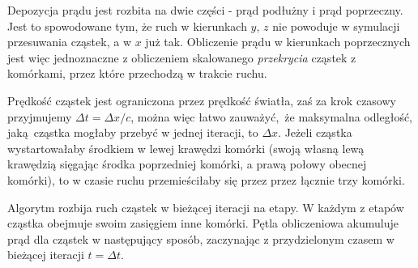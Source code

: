Depozycja prądu jest rozbita na dwie części - prąd podłużny i prąd
poprzeczny. Jest to spowodowane tym, że ruch w kierunkach $y$, $z$ nie
powoduje w symulacji przesuwania cząstek, a w $x$ już tak. Obliczenie prądu
w kierunkach poprzecznych jest więc jednoznaczne z obliczeniem skalowanego
\emph{przekrycia} cząstek z komórkami, przez które przechodzą w trakcie
ruchu.

Prędkość cząstek jest ograniczona przez prędkość światła, zaś za krok czasowy
przyjmujemy $\Delta t = \Delta x/c$, można więc łatwo zauważyć, że maksymalna
odległość, jaką cząstka mogłaby przebyć w jednej iteracji, to $\Delta x$.
Jeżeli cząstka wystartowałaby środkiem w lewej krawędzi komórki (swoją
własną lewą krawędzią sięgając środka poprzedniej komórki, a prawą połowy
obecnej komórki), to w czasie ruchu przemieściłaby się przez
przez łącznie trzy komórki.  %

Algorytm rozbija ruch cząstek w bieżącej iteracji na etapy. W każdym z
etapów cząstka obejmuje swoim zasięgiem inne komórki. Pętla obliczeniowa
akumuluje prąd dla cząstek w następujący sposób, zaczynając z przydzielonym
czasem w bieżącej iteracji $t = \Delta t$.

